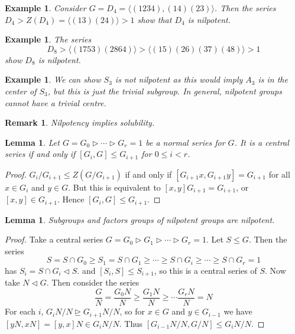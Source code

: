 \documentclass[a4paper,10pt]{article}
\newtheorem{eg}[thm]{Example}
\newtheorem{Lem}[thm]{Lemma}
\newtheorem{rem}[thm]{Remark}
\begin{document}
\begin{eg}
Consider $G = D_4 = \langle (1234), (14)(23) \rangle$. Then the series $D_4 > Z(D_4) = \langle (13)(24) \rangle > 1$ show that $D_4$ is nilpotent. 
\end{eg}

\begin{eg}
The series
\[ D_8 > \langle (1753)(2864) \rangle > \langle (15)(26)(37)(48) \rangle > 1 \]
show $D_8$ is nilpotent.
\end{eg}

\begin{eg}
We can show $S_3$ is not nilpotent as this would imply $A_3$ is in the center of $S_3$, but this is just the trivial subgroup. In general, nilpotent groups cannot have a trivial centre. 
\end{eg}

\begin{rem}
Nilpotency implies solubility.  
\end{rem}

\begin{Lem}
Let $G = G_0 \triangleright \cdots \triangleright G_r = 1$ be a normal series for $G$. It is a central series if and only if $[G_i, G] \leq G_{i+1}$ for $0 \leq i < r$.
\end{Lem}

\begin{proof}
$G_i / G_{i+1} \leq Z(G / G_{i+1})$ if and only if $[G_{i+1}x, G_{i+1}y] = G_{i+1}$ for all $x \in G_i$ and $y \in G$. But this is equivalent to $[x,y] G_{i+1} = G_{i+1}$, or $[x,y] \in G_{i+1}$. Hence $[G_{i}, G] \leq G_{i+1}$. 
\end{proof}


\begin{Lem}
Subgroups and factors groups of nilpotent groups are nilpotent. 
\end{Lem}

\begin{proof}
Take a central series $G = G_0 \triangleright G_1 \triangleright \cdots \triangleright G_r = 1$. Let $S \leq G$. Then the series
\[ S = S \cap G_0 \geq S_1 = S \cap G_1 \geq \cdots \geq S \cap G_i \geq \cdots \geq S \cap G_r = 1 \]
has $S_i = S \cap G_i \triangleleft S$. and $[S_i, S] \leq S_{i+1}$, so this is a central series of $S$. Now take $N \triangleleft G$. Then consider the series
\[ \frac{G}{N} = \frac{G_0 N}{N} \geq \frac{G_1 N }{N} \geq \cdots \frac{G_r N}{N} = N \]
For each $i$, $G_iN / N \trianglerighteq G_{i+1}N / N$, so for $x \in G$ and $y \in G_{i-1}$ we have $[yN, xN] = [y,x]N \in G_i N / N$. Thus $[ G_{i-1}N / N, G / N ] \leq G_{i}N / N$. 
\end{proof}
\end{document}
